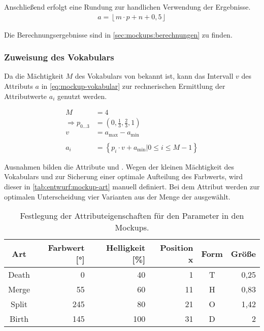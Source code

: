Anschließend erfolgt eine Rundung zur handlichen Verwendung der Ergebnisse.
\begin{align}\label{eq:mockup-rundung}
	a = \left\lfloor m \cdot p + n + 0,5 \right\rfloor
\end{align}

Die Berechnungsergebnisse sind in \autoref{sec:mockups:berechnungen} zu finden.

\subsubsection{Zuweisung des Vokabulars}

Da die Mächtigkeit $M$ des Vokabulars von  bekannt ist, kann das Intervall $v$ des Attributs $a$ in \autoref{eq:mockup-vokabular} zur rechnerischen Ermittlung der Attributwerte $a_i$ genutzt werden.

\begin{equation}
\begin{aligned}\label{eq:mockup-vokabular}
M &= 4\\
\Rightarrow p_{0\ldots 3} &= \left( 0, \frac 13, \frac 23, 1 \right) \\
v &= a_{\text{max}} - a_{\text{min}}\\
\\
a_i &= \left\lbrace p_i \cdot v + a_{\text{min}} \left| 0 \le i \le M-1 \right. \right\rbrace 
\end{aligned}
\end{equation}

Ausnahmen bilden die Attribute  und . Wegen der kleinen Mächtigkeit des Vokabulars und zur Sicherung einer optimale Aufteilung des Farbwerts, wird dieser in \autoref{tab:entwurf:mockup-art} manuell definiert. Bei dem Attribut  werden zur optimalen Unterscheidung vier Varianten aus der Menge der  ausgewählt.

\begin{table}
	\begin{tabularx}{\textwidth}{@{}CRRRCR@{}}
		\toprule
		Art & Farbwert [°] & Helligkeit [\%] & Position x & Form & Größe \tabularnewline
		\midrule
		Death & 0   & 40  & 1  & T & 0,25 \tabularnewline
		Merge & 55  & 60  & 11 & H & 0,83 \tabularnewline
		Split & 245 & 80  & 21 & O & 1,42 \tabularnewline
		Birth & 145 & 100 & 31 & D & 2 \tabularnewline
		\bottomrule
	\end{tabularx}
	\caption{Festlegung der Attributeigenschaften für den Parameter  in den Mockups.}\label{tab:entwurf:mockup-art}
\end{table}

